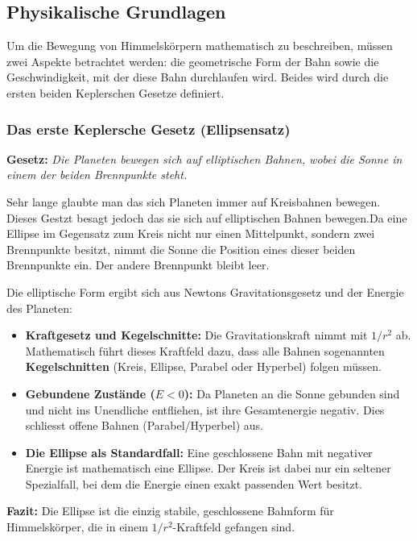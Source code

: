 \subsection{Physikalische Grundlagen}
\label{kepler:subsection:Grundlagen}

Um die Bewegung von Himmelskörpern mathematisch zu beschreiben, müssen zwei  Aspekte betrachtet werden: die geometrische Form der Bahn sowie die Geschwindigkeit, mit der diese Bahn durchlaufen wird. Beides wird durch die ersten beiden Keplerschen Gesetze definiert.

\subsubsection{Das erste Keplersche Gesetz (Ellipsensatz)}
\textbf{Gesetz:} \textit{Die Planeten bewegen sich auf elliptischen Bahnen, wobei die Sonne in einem der beiden Brennpunkte steht.}

Sehr lange glaubte man das sich Planeten immer auf Kreisbahnen bewegen. Dieses Gestzt besagt jedoch das sie sich auf elliptischen Bahnen bewegen.Da eine Ellipse im Gegensatz zum Kreis nicht nur einen Mittelpunkt, sondern zwei Brennpunkte besitzt, nimmt die Sonne die Position eines dieser beiden Brennpunkte ein. Der andere Brennpunkt bleibt leer.

Die elliptische Form ergibt sich aus Newtons Gravitationsgesetz und der Energie des Planeten:

\begin{itemize}
    \item \textbf{Kraftgesetz und Kegelschnitte:} Die Gravitationskraft nimmt mit $1/r^2$ ab. Mathematisch führt dieses Kraftfeld dazu, dass alle Bahnen sogenannten \textbf{Kegelschnitten} (Kreis, Ellipse, Parabel oder Hyperbel) folgen müssen.
    \item \textbf{Gebundene Zustände ($E < 0$):} Da Planeten an die Sonne gebunden sind und nicht ins Unendliche entfliehen, ist ihre Gesamtenergie negativ. Dies schliesst offene Bahnen (Parabel/Hyperbel) aus.
    \item \textbf{Die Ellipse als Standardfall:} Eine geschlossene Bahn mit negativer Energie ist mathematisch eine Ellipse. Der Kreis ist dabei nur ein seltener Spezialfall, bei dem die Energie einen exakt passenden Wert besitzt.
\end{itemize}

\textbf{Fazit:} Die Ellipse ist die einzig stabile, geschlossene Bahnform für Himmelskörper, die in einem $1/r^2$-Kraftfeld gefangen sind.


